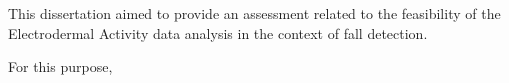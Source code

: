 \label{ch:conclusions}

This dissertation aimed to provide an assessment related to the feasibility of the Electrodermal Activity data analysis in the context of fall detection.

For this purpose, 

